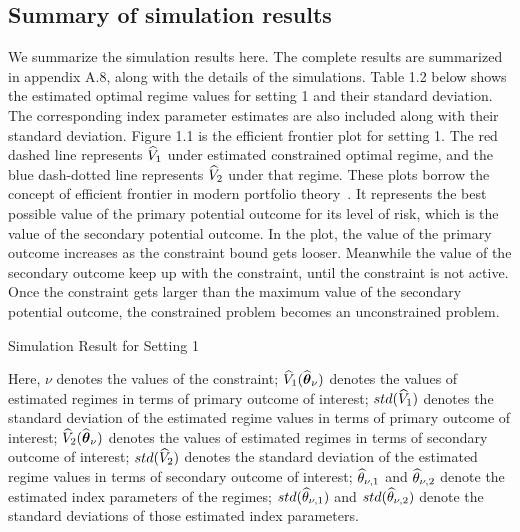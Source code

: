 \subsection{Summary of simulation results}
We summarize the simulation results here. The complete results are summarized in appendix A.8, along with the details of the simulations. Table 1.2 below shows the estimated optimal regime values for setting 1 and their standard deviation. The corresponding index parameter estimates are also included along with their standard deviation. Figure 1.1 is the efficient frontier plot for setting 1. The red dashed line represents $\widehat{V}_1$ under estimated constrained optimal regime, and the blue dash-dotted line represents $\widehat{V}_2$ under that regime. These plots borrow the concept of efficient frontier in modern portfolio theory~\cite{Markowitz1952}. It represents the best possible value of the primary potential outcome for its level of risk, which is the value of the secondary potential outcome. In the plot, the value of the primary outcome increases as the constraint bound gets looser. Meanwhile the value of the secondary outcome keep up with the constraint, until the constraint is not active. Once the constraint gets larger than the maximum value of the secondary potential outcome, the constrained problem becomes an unconstrained problem. \\

\begin{table}[!htbp]
\caption {Simulation Result for Setting 1}
	\centering
	{\tt
		
	}
\justify
Here, $\nu$ denotes the values of the constraint; $\widehat{V}_1(\widehat{\boldsymbol{\theta}}_{\nu})$ denotes the values of estimated regimes in terms of primary outcome of interest; $std(\widehat{V}_1)$ denotes the standard deviation of the estimated regime values in terms of primary outcome of interest; $\widehat{V}_2(\widehat{\boldsymbol{\theta}}_{\nu})$ denotes the values of estimated regimes in terms of secondary outcome of interest; $std(\widehat{V}_2)$ denotes the standard deviation of the estimated regime values in terms of secondary outcome of interest; $\widehat{\theta}_{\nu,1}$ and $\widehat{\theta}_{\nu,2}$ denote the estimated index parameters of the regimes; $std(\widehat{\theta}_{\nu,1})$ and $std(\widehat{\theta}_{\nu,2})$ denote the standard deviations of those estimated index parameters.	
\end{table} 



